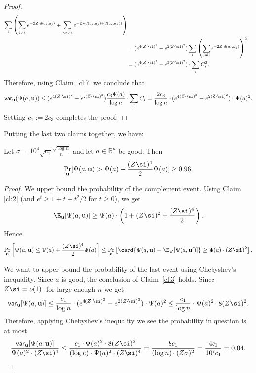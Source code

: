 \begin{proof}
\begin{align*}
 \sum_{i}
 \left(\sum_{j\neq i} e^{-2Z\cdot d(a_i,a_j)} + \sum_{j,k\neq i}
e^{-Z\cdot (d(a_i,a_j)+d(a_i,a_k))}\right)\\
&=(e^{4 (Z\cdot \si)^2}-e^{2 (Z\cdot \si)^2})\sum\limits_{i}\left(\sum_{j\neq i} e^{-2Z\cdot d(a_i,a_j)}\right)^2\\
&=  (e^{4 (Z\cdot \si)^2}-e^{2 (Z\cdot \si)^2}) \cdot \sum_i C_i^2.
\end{align*}
Therefore, using Claim~\ref{cl:7} we conclude that
\begin{multline*}
{\sf var}_{\bf u} ( \Psi(a,{\bf u}))
\leq
( e^{4 (Z\cdot \si)^2}-e^{2 (Z\cdot \si)^2}) \frac{c_3\Psi(a)}{\log n}\cdot \sum_i C_i =
\frac{2 c_3}{\log n}\cdot
( e^{4 (Z\cdot \si)^2}-e^{2 (Z\cdot \si)^2}) \cdot \Psi(a)^2.
\end{multline*}
Setting $c_1:=2c_3$ completes the proof.
\end{proof}

Putting the last two claims together, we have:

\begin{claim}
	\label{cl:4}
Let $\sigma = 10^4\sqrt{c_1} \frac{\sqrt{\log n}}{n}$ and let $a\in\mathbb{R}^n$ be good.
Then
\[
\Pr_{{\bf u}}[\Psi(a,{\bf u})>\Psi(a)+\frac{(Z\si)^4}{2}\Psi(a)]\geq 0.96.
\]
\end{claim}
\begin{proof}
	We upper bound the probability of the complement event. Using Claim \ref{cl:2} (and $e^{t}\geq 1+t+t^2/2$ for $t\geq 0$), we get
	\[
	\E_{\bf u}[\Psi(a,{\bf u})]\geq \Psi(a)\cdot \left(1+(Z \si)^2+\frac{(Z\si)^4}{2}\right).
	\]
	Hence
	\[
	\Pr_{{\bf u}}\left[\Psi(a,{\bf u})\leq \Psi(a)+\frac{(Z\si)^4}{2}\Psi(a)\right] \leq \Pr_{{\bf u}}\left[\card{\Psi(a,{\bf u})- \E_{{\bf u'}}[\Psi(a,{\bf u'})]}\geq
\Psi(a)\cdot  (Z \si)^2\right].
	\]

    We want to upper bound the probability of the last event using Chebyshev's inequality.
    Since $a$ is good, the conclusion of Claim~\ref{cl:3} holds.
    Since $Z \si =o(1)$, for large enough $n$ we get
	\[
	{\sf var}_{\bf u} [\Psi(a,{\bf u})]
    \leq
    \frac{c_1}{\log n} \cdot( e^{4(Z \cdot \si)^2}
	-e^{2(Z \cdot \si)^2})\cdot \Psi(a)^2
    \leq \frac{c_1}{\log n} \cdot \Psi(a)^2\cdot 8(Z \si)^2.
	\]
    Therefore, applying Chebyshev's inequality we see the probability in question is at most
    \[
	\frac{{\sf var}_{\bf u} [\Psi(a,{\bf u})]}{\Psi(a)^2 \cdot  (Z \si)^4} \leq
	\frac{c_1 \cdot \Psi(a)^2 \cdot 8 (Z \si)^2}{(\log n)\cdot \Psi(a)^2 \cdot  (Z \si)^4 }
    = \frac{8c_1}{(\log n)\cdot (Z\sigma)^2 } = \frac{4 c_1}{10^2 c_1} = 0.04.\qedhere
    \]
\end{proof}


